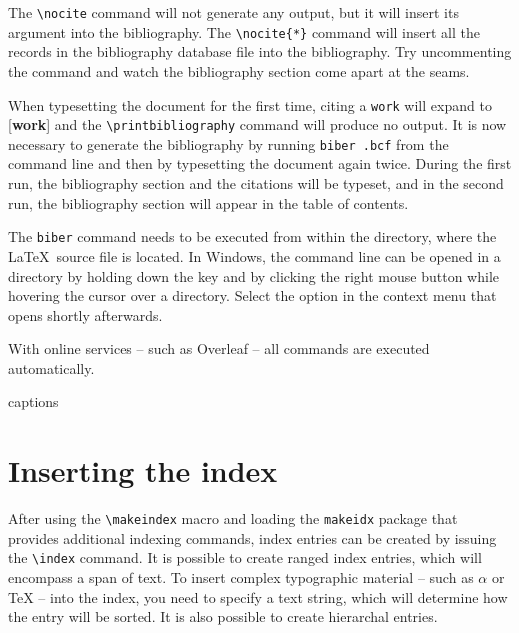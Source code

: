 \documentclass[
  digital, %
  table,   %
  lof,     %
  lot,     %
]{fithesis3}
\begin{document}
The \verb"\nocite" command will not generate any
output\nocite{booklet-full}, but it will insert its argument into
the bibliography. The \verb"\nocite{*}" command will insert all the
records in the bibliography database file into the bibliography.
Try uncommenting the command
and watch the bibliography section come apart at the seams.

When typesetting the document for the first time, citing a
\texttt{work} will expand to [\textbf{work}] and the
\verb"\printbibliography" command will produce no output. It is now
necessary to generate the bibliography by running \texttt{biber
\jobname.bcf} from the command line and then by typesetting the
document again twice. During the first run, the bibliography
section and the citations will be typeset, and in the second run,
the bibliography section will appear in the table of contents.

The \texttt{biber} command needs to be executed from within the
directory, where the \LaTeX\ source file is located. In Windows,
the command line can be opened in a directory by holding down the
 key and by clicking the right mouse button while
hovering the cursor over a directory.  Select the  option in the context menu that opens shortly
afterwards.

With online services -- such as Overleaf -- all commands are
executed automatically.

{\csname captions\languagename\endcsname %
\makeatletter %
  \thesis@selectLocale{\thesis@locale}\makeatother
\printbibliography[heading=bibintoc]} %

\chapter{Inserting the index}
After using the \verb"\makeindex" macro and loading the
\texttt{makeidx} package that provides additional indexing
commands, index entries can be created by issuing the \verb"\index"
command. It is possible to create ranged index
entries, which will encompass a span of text.
To insert complex typographic material -- such as $\alpha$
 or \TeX{}  --
into the index, you need to specify a text string, which will
determine how the entry will be sorted. It is also possible to
create hierarchal entries. 
\end{document}
